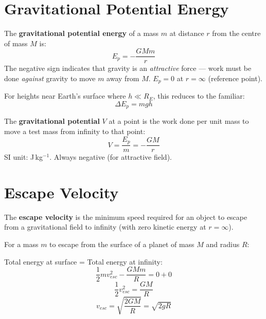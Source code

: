 \section{Gravitational Potential Energy}
 
\begin{definitionbox}
The \textbf{gravitational potential energy} of a mass
$m$ at distance $r$ from the centre of mass $M$ is:
\[
  E_p = -\frac{GMm}{r}
\]
The negative sign indicates that gravity is an
\textit{attractive} force --- work must be done
\textit{against} gravity to move $m$ away from $M$.
$E_p = 0$ at $r = \infty$ (reference point).
 
For heights near Earth's surface where $h \ll R_E$,
this reduces to the familiar:
\[
  \Delta E_p = mgh
\]
\end{definitionbox}
 
\begin{definitionbox}
The \textbf{gravitational potential} $V$ at a point
is the work done per unit mass to move a test mass
from infinity to that point:
\[
  V = \frac{E_p}{m} = -\frac{GM}{r}
\]
SI unit: J\,kg$^{-1}$. Always negative (for attractive
field).
\end{definitionbox}
 
\section{Escape Velocity}
 
\begin{definitionbox}
The \textbf{escape velocity} is the minimum speed
required for an object to escape from a gravitational
field to infinity (with zero kinetic energy at
$r = \infty$).
\end{definitionbox}
 
\begin{processbox}
For a mass $m$ to escape from the surface of a planet
of mass $M$ and radius $R$:
 
Total energy at surface = Total energy at infinity:
\[
  \frac{1}{2}mv_{esc}^2 - \frac{GMm}{R}
  = 0 + 0
\]
\[
  \frac{1}{2}v_{esc}^2 = \frac{GM}{R}
\]
\[
  \boxed{v_{esc} = \sqrt{\frac{2GM}{R}} = \sqrt{2gR}}
\]
\end{processbox}
 
